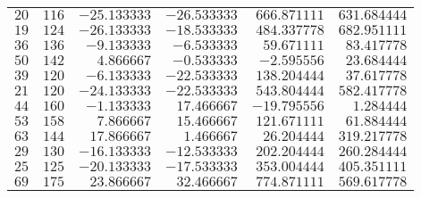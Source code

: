 \begin{tabular}{rrrrrr}
$20$    & $116$           & $-25.133333$  & $-26.533333$  & $666.871111$  & $631.684444$   \\
$19$    & $124$           & $-26.133333$  & $-18.533333$  & $484.337778$  & $682.951111$   \\
$36$    & $136$           & $-9.133333$   & $-6.533333$   & $59.671111$   & $83.417778$    \\
$50$    & $142$           & $4.866667$    & $-0.533333$   & $-2.595556$   & $23.684444$    \\
$39$    & $120$           & $-6.133333$   & $-22.533333$  & $138.204444$  & $37.617778$    \\
$21$    & $120$           & $-24.133333$  & $-22.533333$  & $543.804444$  & $582.417778$   \\
$44$    & $160$           & $-1.133333$   & $17.466667$   & $-19.795556$  & $1.284444$     \\
$53$    & $158$           & $7.866667$    & $15.466667$   & $121.671111$  & $61.884444$    \\
$63$    & $144$           & $17.866667$   & $1.466667$    & $26.204444$   & $319.217778$   \\
$29$    & $130$           & $-16.133333$  & $-12.533333$  & $202.204444$  & $260.284444$   \\
$25$    & $125$           & $-20.133333$  & $-17.533333$  & $353.004444$  & $405.351111$   \\
$69$    & $175$           & $23.866667$   & $32.466667$   & $774.871111$  & $569.617778$   \\\bottomrule
\end{tabular}
